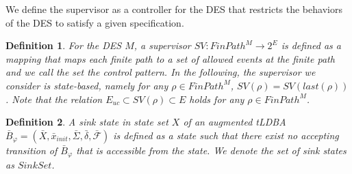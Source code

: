 \documentclass[letterpaper, 10 pt, conference]{ieeeconf}
\newtheorem{definition}{Definition}
\begin{document}
We define the supervisor as a controller for the DES that restricts the behaviors of the DES to satisfy a given specification.

\begin{definition}
For the DES $M$,  a supervisor $SV : FinPath^{M} \rightarrow 2^E$ is defined as a mapping that maps each finite path to a set of allowed events at the finite path and we call the set the control pattern. In the following, the supervisor we consider is {\it state-based}, namely for any $\rho \in FinPath^{M}$, $SV(\rho) = SV(last(\rho))$. Note that the relation $E_{uc} \subset SV(\rho) \subset E$ holds for any $\rho \in FinPath^M$.
\end{definition}

\begin{definition}
  A sink state in state set $X$ of an augmented tLDBA $\bar{B}_{\varphi} = (\bar{X}, \bar{x}_{init},\bar{\Sigma},\bar{\delta},\bar{\mathcal{F}})$ is defined as a state such that there exist no accepting transition of $\bar{B}_{\varphi}$ that is accessible from the state. We denote the set of sink states as $Sink Set$.
\end{definition}
\end{document}
